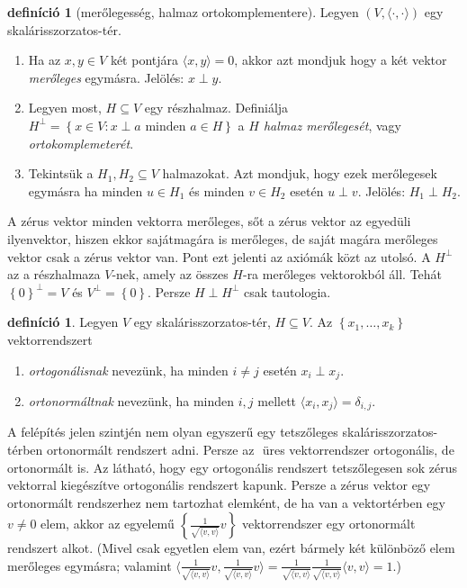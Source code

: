 \documentclass[a4paper, showtrims]{memoir}
\theoremstyle{plain}
\theoremstyle{remark}
\theoremstyle{definition}
\newtheorem{definition}[proposition]{definíció}
\newcommand{\ip}[2]{\langle#1,#2\rangle}
\begin{document}
\begin{definition}[merőlegesség, halmaz ortokomplementere]
	Legyen $\left( V,\ip{\cdot}{\cdot} \right)$ egy skalárisszor\-zatos-tér.
	\begin{enumerate}
		\item
		    Ha az $x,y\in V$ két pontjára $\ip{x}{y}=0$,
		    akkor azt mondjuk hogy a két vektor \emph{merőleges} egymásra.
		    Jelölés: $x\perp y$.
		\item
		    Legyen most, $H\subseteq V$ egy részhalmaz.
		    Definiálja
		    \(
		    H^{\perp}=\left\{ x\in V:x\perp a \text{ minden } a\in H \right\}
		    \)
		    a \emph{$H$ halmaz merőlegesét}, vagy \emph{ortokomplemeterét}.
        \item
            Tekintsük a $H_1,H_2\subseteq V$ halmazokat.
            Azt mondjuk, hogy ezek merőlegesek egymásra ha 
            minden $u\in H_1$ és minden $v\in H_2$ esetén $u\perp v$.
            Jelölés: $H_1\perp H_2$.
            \qedhere
	\end{enumerate}
\end{definition}
A zérus vektor minden vektorra merőleges, sőt a zérus vektor az egyedüli ilyenvektor, 
hiszen ekkor sajátmagára is merőleges, de saját magára merőleges vektor csak a zérus vektor van.
Pont ezt jelenti az axiómák közt az utolsó.
A $H^\perp$ az a részhalmaza $V$-nek, amely az összes $H$-ra merőleges vektorokból áll.
Tehát $\left\{ 0 \right\}^\perp = V$ és $V^{\perp}=\left\{ 0 \right\}$.
Persze $H\perp H^\perp$ csak tautologia.

\begin{definition}
	Legyen $V$ egy skalárisszorzatos-tér, $H\subseteq V$.
	Az $\left\{ x_1,\ldots,x_k \right\}$ vektorrendszert
	\begin{enumerate}
		\item \emph{ortogonálisnak} nevezünk, ha minden $i\neq j$ esetén
		      $x_i\perp x_j$.
		\item \emph{ortonormáltnak} nevezünk, ha minden $i,j$ mellett $\ip{x_i}{x_j}=\delta_{i,j}$.\qedhere
	\end{enumerate}
\end{definition}
A felépítés jelen szintjén nem olyan egyszerű egy tetszőleges skalárisszorzatos-térben ortonormált rendszert
adni. Persze az ${}$ üres vektorrendszer ortogonális, de ortonormált is.
Az látható, hogy egy ortogonális rendszert tetszőlegesen sok zérus vektorral kiegészítve ortogonális rendszert kapunk.
Persze a zérus vektor egy ortonormált rendszerhez nem tartozhat elemként,
de ha van a vektortérben egy $v\neq 0$ elem,
akkor az egyelemű $\left\{ \frac{1}{\sqrt{\ip{v}{v}}}v \right\}$ vektorrendszer egy ortonormált rendszert alkot.
(Mivel csak egyetlen elem van, ezért bármely két különböző elem merőleges egymásra;
valamint
$\ip{\frac{1}{\sqrt{\ip{v}{v}}}v}{\frac{1}{\sqrt{\ip{v}{v}}}v}
	=
	\frac{1}{\sqrt{\ip{v}{v}}}
	\frac{1}{\sqrt{\ip{v}{v}}}
	\ip{v}{v}=1.
$)
\end{document}

